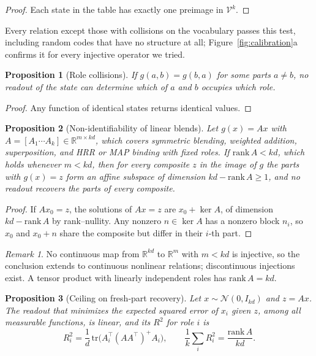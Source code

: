 \documentclass[10pt]{article}
\theoremstyle{plain}
\newtheorem{proposition}{Proposition}
\theoremstyle{remark}
\newtheorem*{remark}{Remark}
\newcommand{\R}{\mathbb{R}}
\newcommand{\Voc}{\mathcal{V}}
\begin{document}
\begin{proof}
Each state in the table has exactly one preimage in $\Voc^k$.
\end{proof}

\noindent
Every relation except those with collisions on the vocabulary passes this test, including random codes that have no structure at all; Figure~\ref{fig:calibration}a confirms it for every injective operator we tried.

\begin{proposition}[Role collisions]
\label{prop:blend}
If $g(a, b) = g(b, a)$ for some parts $a \neq b$, no readout of the state can determine which of $a$ and $b$ occupies which role.
\end{proposition}

\begin{proof}
Any function of identical states returns identical values.
\end{proof}

\begin{proposition}[Non-identifiability of linear blends]
\label{prop:fiber}
Let $g(x) = Ax$ with $A = [A_1 \cdots A_k] \in \R^{m \times kd}$, which covers symmetric blending, weighted addition, superposition, and HRR or MAP binding with fixed roles. If $\mathrm{rank}\,A < kd$, which holds whenever $m < kd$, then for every composite $z$ in the image of $g$ the parts with $g(x) = z$ form an affine subspace of dimension $kd - \mathrm{rank}\,A \geq 1$, and no readout recovers the parts of every composite.
\end{proposition}

\begin{proof}
If $Ax_0 = z$, the solutions of $Ax = z$ are $x_0 + \ker A$, of dimension $kd - \mathrm{rank}\,A$ by rank--nullity. Any nonzero $n \in \ker A$ has a nonzero block $n_i$, so $x_0$ and $x_0 + n$ share the composite but differ in their $i$-th part.
\end{proof}

\begin{remark}
No continuous map from $\R^{kd}$ to $\R^m$ with $m < kd$ is injective, so the conclusion extends to continuous nonlinear relations; discontinuous injections exist. A tensor product with linearly independent roles has $\mathrm{rank}\,A = kd$.
\end{remark}

\begin{proposition}[Ceiling on fresh-part recovery]
\label{prop:ceiling}
Let $x \sim \mathcal{N}(0, I_{kd})$ and $z = Ax$. The readout that minimizes the expected squared error of $x_i$ given $z$, among all measurable functions, is linear, and its $R^2$ for role $i$ is
\begin{equation}
  R^2_i = \frac{1}{d}\,\mathrm{tr}\big(A_i^{\top} (A A^{\top})^{+} A_i\big), \qquad \frac{1}{k}\sum_i R^2_i = \frac{\mathrm{rank}\,A}{kd}.
\end{equation}
\end{proposition}
\end{document}
